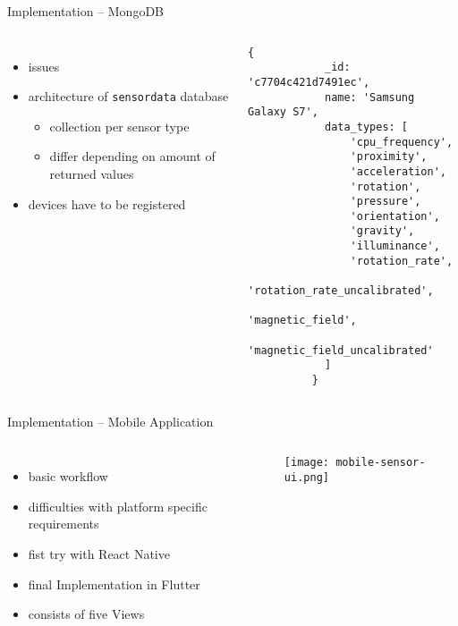 \documentclass[aspectratio=169]{beamer}
\begin{document}
  \begin{frame}[fragile]{Implementation -- MongoDB}
    \begin{columns}
        \begin{itemize}
          \item issues
          \item architecture of \texttt{sensordata} database
            \begin{itemize}
              \item collection per sensor type
              \item differ depending on amount of returned values
            \end{itemize}
          \item devices have to be registered
        \end{itemize}
          \begin{lstlisting}[language=mongo, basicstyle=\scriptsize\ttfamily]
          {
            _id: 'c7704c421d7491ec',
            name: 'Samsung Galaxy S7',
            data_types: [
                'cpu_frequency',
                'proximity',
                'acceleration',
                'rotation',
                'pressure',
                'orientation',
                'gravity',
                'illuminance',
                'rotation_rate',
                'rotation_rate_uncalibrated',
                'magnetic_field',
                'magnetic_field_uncalibrated'
            ]
          }
          \end{lstlisting}
     \end{columns}
  \end{frame}

  \begin{frame}{Implementation -- Mobile Application}
    \begin{columns}
        \begin{itemize}
          \item basic workflow
          \item difficulties with platform specific requirements
          \item fist try with React Native
          \item final Implementation in Flutter
          \item consists of five Views
        \end{itemize}
        \vfill
        \centering
        \texttt{[image: mobile-sensor-ui.png]}
     \end{columns}
  \end{frame}
\end{document}
